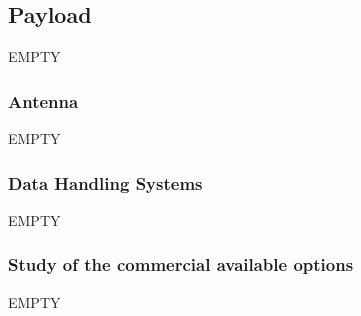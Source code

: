 \subsection{Payload}

EMPTY

\subsubsection{Antenna}
EMPTY
\subsubsection{Data Handling Systems}
EMPTY

\subsubsection{Study of the commercial available options}
EMPTY

